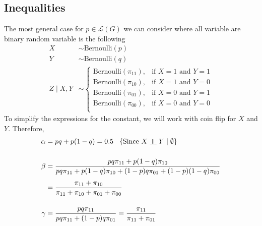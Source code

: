 \documentclass{article}
\numberwithin{equation}{section}
\newcommand{\s}{\hspace{0.1cm}}
\newcommand{\indep}{\s \rotatebox[origin=c]{90}{$\models$}\s }
\begin{document}
\subsection{Inequalities}
The most general case for $p \in \mathcal{L}(G)$ we can consider where all variable 
are binary random variable is the following 
\begin{align*}
        X & \sim \text{Bernoulli}(p) \\
        Y &\sim \text{Bernoulli}(q) \\[4ex]
        Z \mid X, Y &\sim \left\{ 
                \begin{array}{cc}
                \text{Bernoulli}(\pi_{11}),& \text{if } X = 1 \text{ and } Y = 1 \\
                \text{Bernoulli}(\pi_{10}),& \text{if } X = 1 \text{ and } Y = 0 \\
                \text{Bernoulli}(\pi_{01}),& \text{if } X = 0 \text{ and } Y = 1 \\
                \text{Bernoulli}(\pi_{00}),& \text{if } X = 0 \text{ and } Y = 0 \\
        \end{array}
        \right.
\end{align*}
To simplify the expressions for the constant, we will work with coin flip for $X$ and 
$Y$. Therefore,
\begin{align}
        \label{eq:alpha}
        \alpha &= pq + p(1 - q) = 0.5 \s\s\s \{\text{Since } X \indep Y \mid 
        \emptyset\}\\[3ex]
        \nonumber
        \beta &= \frac{pq\pi_{11} + p(1 - q) \pi_{10}}{pq\pi_{11} + p(1 - q) \pi_{10} + 
        (1 - p)q \pi_{01} + (1 - p)(1 - q)\pi_{00}}  \\[1ex]
        \label{eq:beta}
        &= \frac{\pi_{11} + \pi_{10}}{\pi_{11} + \pi_{10} + \pi_{01} + \pi_{00}} \\[3ex]
        \label{eq:gamma}
        \gamma &=  \frac{pq \pi_{11}}{pq \pi_{11} + (1 - p)q \pi_{01}} = 
        \frac{\pi_{11}}{\pi_{11} + \pi_{01}}
\end{align}
\end{document}
